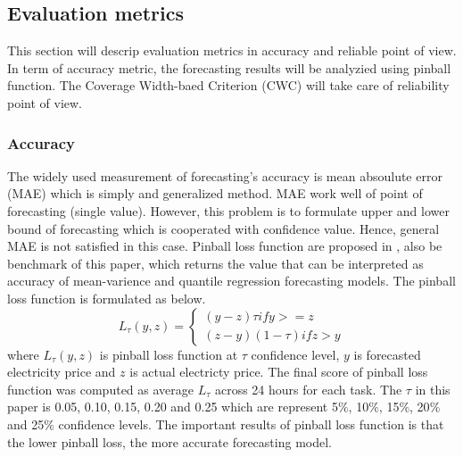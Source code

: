 \documentclass[review]{elsarticle}
\begin{document}
  \subsection{Evaluation metrics}
    This section will descrip evaluation metrics in accuracy and reliable point of view. In term of accuracy metric, the forecasting results will be analyzied using pinball function. The Coverage Width-baed Criterion (CWC) will take care of reliability point of view.

    \subsubsection{Accuracy}
      The widely used measurement of forecasting's accuracy is mean absoulute error (MAE) which is simply and generalized method. MAE work well of point of forecasting (single value). However, this problem is to formulate upper and lower bound of forecasting which is cooperated with confidence value. Hence, general MAE is not satisfied in this case.
      Pinball loss function are proposed in \cite{Maciejowska2016}, also be benchmark of this paper, which returns the value that can be interpreted as accuracy of mean-varience and quantile regression forecasting models. The pinball loss function is formulated as below.
      \begin{equation}
        L_{\tau}(y,z) =
        \begin{cases}
          (y-z)\tau if y>=z \\
          (z-y)(1-\tau) if z>y
        \end{cases}
        \label{eq.pinball}
      \end{equation}
      where $L_{\tau}(y,z)$ is pinball loss function at $\tau$ confidence level, $y$ is forecasted electricity price and $z$ is actual electricty price. The final score of pinball loss function was computed as average $L_{\tau}$ across 24 hours for each task. The $\tau$ in this paper is 0.05, 0.10, 0.15, 0.20 and 0.25 which are represent 5$\%$, 10$\%$, 15$\%$, 20$\%$ and 25$\%$ confidence levels.
      The important results of pinball loss function is that the lower pinball loss, the more accurate forecasting model.
\end{document}
